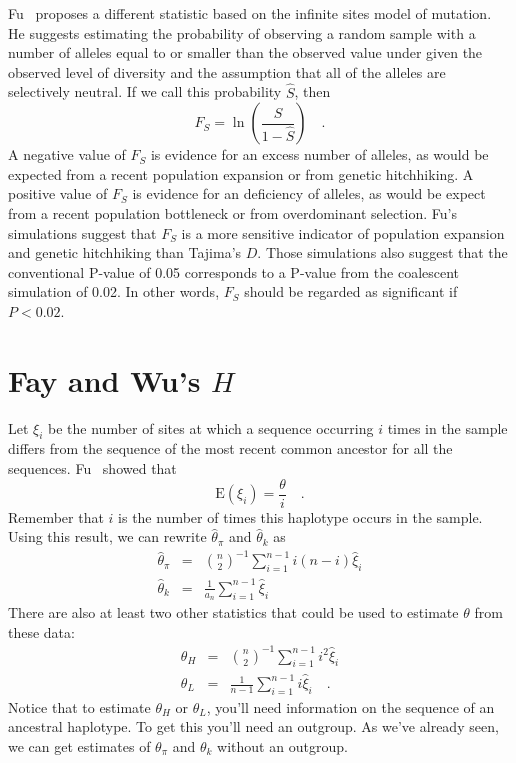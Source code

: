 Fu~\cite{Fu-1997} proposes a different statistic based on the infinite
sites model of mutation. He suggests estimating the probability of
observing a random sample with a number of alleles equal to or smaller
than the observed value under given the observed level of diversity
and the assumption that all of the alleles are selectively neutral. If
we call this probability $\hat S$, then
\[
F_S = \ln\left(\frac{\hat S}{1 - \hat S}\right) \quad .
\]
A negative value of $F_S$ is evidence for an excess number of alleles,
as would be expected from a recent population expansion or from
genetic hitchhiking. A positive value of $F_S$ is evidence for an
deficiency of alleles, as would be expect from a recent population
bottleneck or from overdominant selection. Fu's simulations suggest
that $F_S$ is a more sensitive indicator of population expansion and
genetic hitchhiking than Tajima's $D$. Those simulations also suggest
that the conventional P-value of 0.05 corresponds to a P-value from
the coalescent simulation of 0.02. In other words, $F_S$ should be
regarded as significant if $P < 0.02$.

\section*{Fay and Wu's $H$}

Let $\xi_i$ be the number of sites at which a sequence occurring $i$
times in the sample differs from the sequence of the most recent
common ancestor for all the sequences. Fu~\cite{Fu-1995} showed that
\[
\mbox{E}(\xi_i) = \frac{\theta}{i} \quad .
\]
Remember that $i$ is the number of times this haplotype occurs in the
sample. Using this result, we can rewrite $\hat\theta_\pi$ and
$\hat\theta_k$ as
\begin{eqnarray*}
\hat\theta_\pi &=& {n \choose 2}^{-1}\sum_{i=1}^{n-1}i(n-i)\hat\xi_i \\
\hat\theta_k  &=& \frac{1}{a_n}\sum_{i=1}^{n-1}\hat\xi_i
\end{eqnarray*}
There are also at least two other statistics that could be used to
estimate $\theta$ from these data:
\begin{eqnarray*}
\theta_H &=& {n \choose 2}^{-1}\sum_{i=1}^{n-1}i^2\hat\xi_i \\
\theta_L &=& \frac{1}{n-1}\sum_{i=1}^{n-1}i\hat\xi_i \quad .
\end{eqnarray*}
Notice that to estimate $\theta_H$ or $\theta_L$, you'll
need information on the sequence of an ancestral haplotype. To get
this you'll need an outgroup. As we've already seen, we can get
estimates of $\theta_\pi$ and $\theta_k$ without an outgroup.

